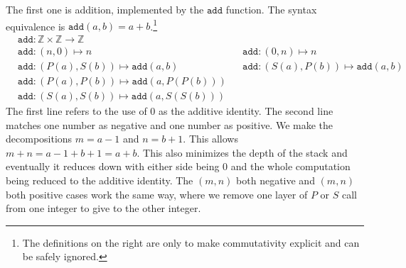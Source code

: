 \documentclass{article}
\newcommand{\Z}{\mathbb{Z}}
\begin{document}
The first one is addition, implemented by the $\mathtt{add}$ function. The syntax equivalence is $\mathtt{add}(a, b) = a + b$.\footnote{The definitions on the right are only to make commutativity explicit and can be safely ignored.}
\begin{align*}
&{} \mathtt{add} : \Z \times \Z \to \Z \\
&{} \mathtt{add} : (n,0) \mapsto n &&{} \mathtt{add} : (0, n) \mapsto n \\
&{} \mathtt{add} : (P(a), S(b)) \mapsto \mathtt{add}(a, b) &&{} \mathtt{add} : (S(a), P(b)) \mapsto \mathtt{add}(a, b) \\
&{} \mathtt{add} : (P(a), P(b)) \mapsto \mathtt{add}(a, P(P(b))) \\
&{} \mathtt{add} : (S(a), S(b)) \mapsto \mathtt{add}(a, S(S(b)))
\end{align*}
The first line refers to the use of 0 as the additive identity. The second line matches one number as negative and one number as positive.   We make the decompositions $m = a - 1$ and $n = b + 1$. This allows $m + n = a - 1 + b + 1 = a + b$. This also minimizes the depth of the stack and eventually it reduces down with either side being 0 and the whole computation being reduced to the additive identity. The $(m, n)$ both negative and $(m, n)$ both positive cases work the same way, where we remove one layer of $P$ or $S$ call from one integer to give to the other integer.
\end{document}
